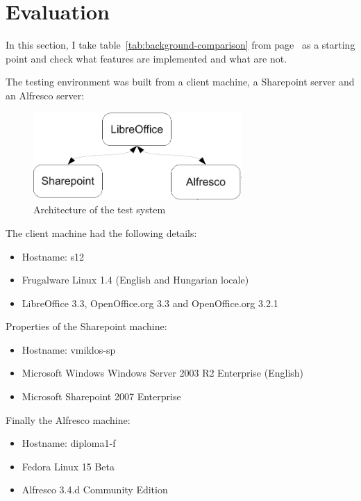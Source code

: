 \section{Evaluation}

In this section, I take table~\ref{tab:background-comparison} from
page~\pageref{tab:background-comparison} as a starting point and check what
features are implemented and what are not.

The testing environment was built from a client machine, a Sharepoint server
and an Alfresco server:

\begin{figure}[H]
\centering
\includegraphics[width=300px,keepaspectratio]{test-arch.pdf}
\caption{Architecture of the test system}
\end{figure}

The client machine had the following details:
\begin{itemize}
\item Hostname: s12
\item Frugalware Linux 1.4 (English and Hungarian locale)
\item LibreOffice 3.3, OpenOffice.org 3.3 and OpenOffice.org 3.2.1
\end{itemize}

Properties of the Sharepoint machine:

\begin{itemize}
\item Hostname: vmiklos-sp
\item Microsoft Windows Windows Server 2003 R2 Enterprise (English)
\item Microsoft Sharepoint 2007 Enterprise
\end{itemize}

Finally the Alfresco machine:

\begin{itemize}
\item Hostname: diploma1-f
\item Fedora Linux 15 Beta
\item Alfresco 3.4.d Community Edition
\end{itemize}

